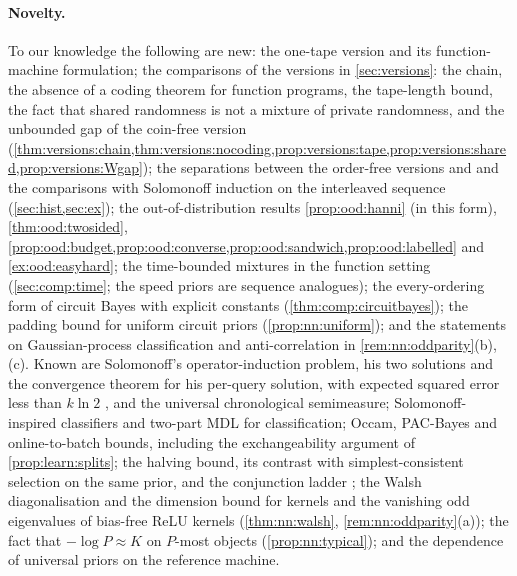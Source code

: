\paragraph{Novelty.}\label{rem:related:new}
To our knowledge the following are new: the one-tape version and its function-machine formulation; the comparisons of the versions in \cref{sec:versions}: the chain, the absence of a coding theorem for function programs, the tape-length bound, the fact that shared randomness is not a mixture of private randomness, and the unbounded gap of the coin-free version (\cref{thm:versions:chain,thm:versions:nocoding,prop:versions:tape,prop:versions:shared,prop:versions:Wgap}); the separations between the order-free versions and \SFIhist{} and the comparisons with Solomonoff induction on the interleaved sequence (\cref{sec:hist,sec:ex}); the out-of-distribution results \cref{prop:ood:hanni} (in this form), \cref{thm:ood:twosided}, \cref{prop:ood:budget,prop:ood:converse,prop:ood:sandwich,prop:ood:labelled} and \cref{ex:ood:easyhard}; the time-bounded mixtures in the function setting (\cref{sec:comp:time}; the speed priors are sequence analogues); the every-ordering form of circuit Bayes with explicit constants (\cref{thm:comp:circuitbayes}); the padding bound for uniform circuit priors (\cref{prop:nn:uniform}); and the statements on Gaussian-process classification and anti-correlation in \cref{rem:nn:oddparity}(b),(c). Known are Solomonoff's operator-induction problem, his two solutions and the convergence theorem for his per-query solution, with expected squared error less than $k\ln2$ \citep{solomonoff2008three}, and the universal chronological semimeasure; Solomonoff-inspired classifiers and two-part MDL for classification; Occam, PAC-Bayes and online-to-batch bounds, including the exchangeability argument of \cref{prop:learn:splits}; the halving bound, its contrast with simplest-consistent selection on the same prior, and the conjunction ladder \citep{vaintrobhanni2026nnbayes}; the Walsh diagonalisation and the dimension bound for kernels and the vanishing odd eigenvalues of bias-free ReLU kernels (\cref{thm:nn:walsh}, \cref{rem:nn:oddparity}(a)); the fact that $-\log P\approx K$ on $P$-most objects (\cref{prop:nn:typical}); and the dependence of universal priors on the reference machine.
